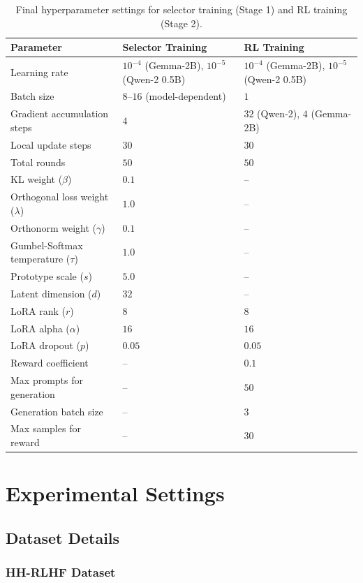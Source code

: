 \begin{table}[h]
\centering
\caption{Final hyperparameter settings for selector training (Stage 1) and RL training (Stage 2).}
\label{tab:hp_final}
\small
\begin{tabular}{lll}
\toprule
\textbf{Parameter} & \textbf{Selector Training} & \textbf{RL Training} \\
\midrule
Learning rate & $10^{-4}$ (Gemma-2B), $10^{-5}$ (Qwen-2 0.5B) & $10^{-4}$ (Gemma-2B), $10^{-5}$ (Qwen-2 0.5B) \\
Batch size & $8$--$16$ (model-dependent) & $1$ \\
Gradient accumulation steps & $4$ & $32$ (Qwen-2), $4$ (Gemma-2B) \\
Local update steps & $30$ & $30$ \\
Total rounds & $50$ & $50$ \\
KL weight ($\beta$) & $0.1$ & -- \\
Orthogonal loss weight ($\lambda$) & $1.0$ & -- \\
Orthonorm weight ($\gamma$) & $0.1$ & -- \\
Gumbel-Softmax temperature ($\tau$) & $1.0$ & -- \\
Prototype scale ($s$) & $5.0$ & -- \\
Latent dimension ($d$) & $32$ & -- \\
LoRA rank ($r$) & $8$ & $8$ \\
LoRA alpha ($\alpha$) & $16$ & $16$ \\
LoRA dropout ($p$) & $0.05$ & $0.05$ \\
Reward coefficient & -- & $0.1$ \\
Max prompts for generation & -- & $50$ \\
Generation batch size & -- & $3$ \\
Max samples for reward & -- & $30$ \\
\bottomrule
\end{tabular}
\end{table}

\section{Experimental Settings}
\label{app:experimental}

\subsection{Dataset Details}

\subsubsection{HH-RLHF Dataset}

